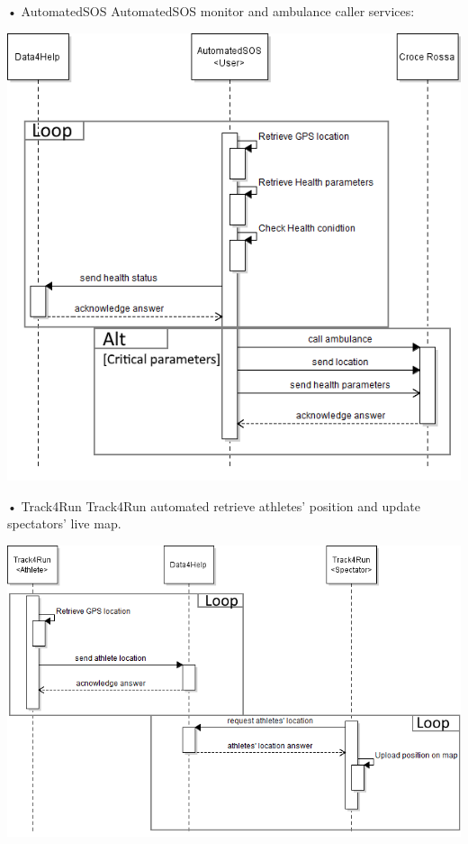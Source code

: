 \begin{enumerate}
\begin{minipage}{\textwidth}
\FloatBarrier
\end{minipage}


\begin{minipage}{\textwidth}
\item[•]{\Large AutomatedSOS}
\FloatBarrier
AutomatedSOS monitor and ambulance caller services:
\begin{center}
\includegraphics[scale=0.8]{Images/Seq_AutoSOS_monitor.png}
\end{center}
\FloatBarrier

\item[•]{\Large Track4Run}
\FloatBarrier
Track4Run automated retrieve athletes' position and update spectators' live map.
\begin{center}
\includegraphics[scale=0.8]{Images/Seq_Track4Run_raceUp.png}
\end{center}
\FloatBarrier
\end{minipage}

\end{enumerate}



